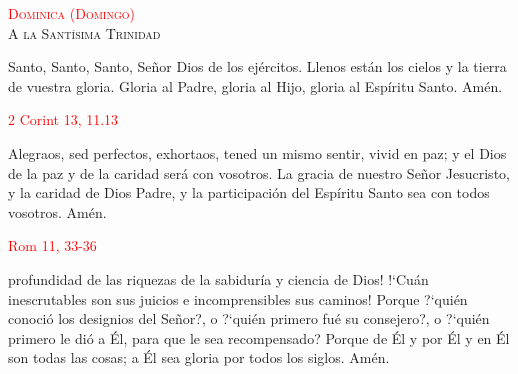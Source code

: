 \documentclass[10pt]{article}
\begin{document}
\begin{multicols}{2}
\begin{otherlanguage}{latin}
            \vspace{1mm}

            

            \vspace{1mm}

            

            \vspace{1mm}

            

            \vspace{1mm}

            
      \end{otherlanguage}


      \begin{center}
            \noindent\textsc{\textcolor{red}{Dominica (Domingo)}\\ {\large A la Santísima Trinidad}}
      \end{center}

      Santo, Santo, Santo, Señor Dios de los ejércitos. Llenos están los cielos y la tierra de vuestra gloria. Gloria al Padre, gloria al Hijo, gloria al Espíritu Santo. Amén.

      \vspace{2mm}

      \hfill\textcolor{red}{2 Corint 13, 11.13}

      Alegraos, sed perfectos, exhortaos, tened un mismo sentir, vivid en paz; y el Dios de la paz y de la caridad será con vosotros. La gracia de nuestro Señor Jesucristo,
      y la caridad de Dios Padre, y la participación del Espíritu Santo sea con todos vosotros. Amén.

      \vspace{2mm}

      \hfill\textcolor{red}{Rom 11, 33-36}

      profundidad de las riquezas de la sabiduría y ciencia de Dios! {!`}Cuán inescrutables son sus juicios e incomprensibles sus caminos! Porque {?`}quién conoció los designios del Señor?,
      o {?`}quién primero fué su consejero?, o {?`}quién primero le dió a Él, para que le sea recompensado? Porque de Él y por Él y en Él son todas las cosas; a Él sea gloria por todos los siglos.
      Amén.


\end{multicols}
\end{document}
